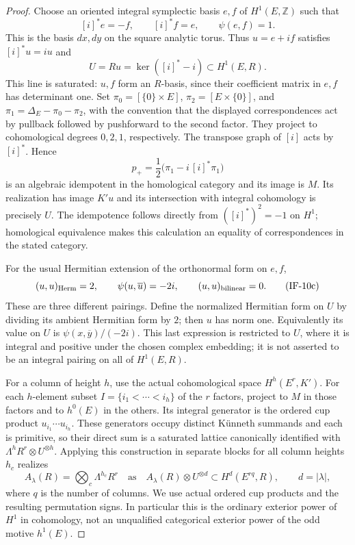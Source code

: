 \begin{proof}
Choose an oriented integral symplectic basis $e,f$ of $H^1(E,\mathbb Z)$
such that
\[
 [i]^*e=-f,\qquad [i]^*f=e,\qquad
 \psi(e,f)=1.
\]
This is the basis $dx,dy$ on the square analytic torus. Thus
$u=e+if$ satisfies $[i]^*u=iu$ and
\[
 U=R u=\ker([i]^*-i)\subset H^1(E,R).
                                                               \tag{IF-10a}
\]
This line is saturated: $u,f$ form an $R$-basis, since their coefficient
matrix in $e,f$ has determinant one. Set
$\pi_0=[\{0\}\times E]$, $\pi_2=[E\times\{0\}]$, and
$\pi_1=\Delta_E-\pi_0-\pi_2$, with the convention that the displayed
correspondences act by pullback followed by pushforward to the second
factor. They project to cohomological degrees $0,2,1$, respectively.
The transpose graph of $[i]$ acts by $[i]^*$. Hence
\[
 p_+=\frac{1}{2}\bigl(\pi_1-i\,[i]^*\pi_1\bigr)
                                                               \tag{IF-10b}
\]
is an algebraic idempotent in the homological category and its image is
$M$. Its realization has image $K'u$ and its intersection with integral
cohomology is precisely $U$. The idempotence follows directly from
$([i]^*)^2=-1$ on $H^1$; homological equivalence makes this calculation
an equality of correspondences in the stated category.

For the usual Hermitian extension of the orthonormal form on $e,f$,
\[
 (u,u)_{\rm Herm}=2,\qquad
 \psi(u,\overline u)=-2i,\qquad
 (u,u)_{\rm bilinear}=0.                         \tag{IF-10c}
\]
These are three different pairings. Define the normalized Hermitian
form on $U$ by dividing its ambient Hermitian form by $2$; then $u$ has
norm one. Equivalently its value on $U$ is
$\psi(x,\overline y)/(-2i)$. This last expression is restricted to
$U$, where it is integral and positive under the chosen complex
embedding; it is not asserted to be an integral pairing on all of
$H^1(E,R)$.

For a column of height $h$, use the actual cohomological space
$H^h(E^r,K')$. For each $h$-element subset
$I=\{i_1<\cdots<i_h\}$ of the $r$ factors, project to $M$ in those
factors and to $h^0(E)$ in the others. Its integral generator is the
ordered cup product $u_{i_1}\cdots u_{i_h}$. These generators occupy
distinct K\"unneth summands and each is primitive, so their direct sum
is a saturated lattice canonically identified with
$\Lambda^h R^r\otimes U^{\otimes h}$. Applying this construction in
separate blocks for all column heights $h_c$ realizes
\[
 A_\lambda(R)=\bigotimes_c\Lambda^{h_c}R^r
 \quad\text{as}\quad
 A_\lambda(R)\otimes U^{\otimes d}
 \subset H^d(E^{rq},R),\qquad d=|\lambda|,
                                                               \tag{IF-10d}
\]
where $q$ is the number of columns. We use actual ordered cup products
and the resulting permutation signs. In particular this is the ordinary
exterior power of $H^1$ in cohomology, not an unqualified categorical
exterior power of the odd motive $h^1(E)$.


\end{proof}
